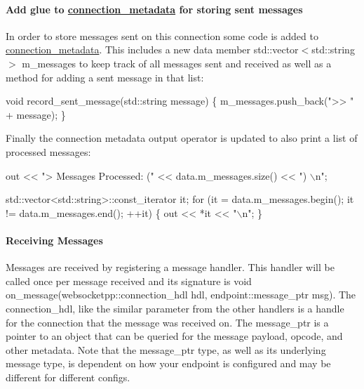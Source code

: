 \paragraph*{Add glue to {\ttfamily \hyperlink{classconnection__metadata}{connection\+\_\+metadata}} for storing sent messages}

In order to store messages sent on this connection some code is added to {\ttfamily \hyperlink{classconnection__metadata}{connection\+\_\+metadata}}. This includes a new data member {\ttfamily std\+::vector$<$std\+::string$>$ m\+\_\+messages} to keep track of all messages sent and received as well as a method for adding a sent message in that list\+:


\begin{DoxyCode}
\textcolor{keywordtype}{void} record\_sent\_message(std::string message) \{
    m\_messages.push\_back(\textcolor{stringliteral}{">> "} + message);
\}
\end{DoxyCode}


Finally the connection metadata output operator is updated to also print a list of processed messages\+:


\begin{DoxyCode}
out << \textcolor{stringliteral}{"> Messages Processed: ("} << data.m\_messages.size() << \textcolor{stringliteral}{") \(\backslash\)n"};

std::vector<std::string>::const\_iterator it;
\textcolor{keywordflow}{for} (it = data.m\_messages.begin(); it != data.m\_messages.end(); ++it) \{
    out << *it << \textcolor{stringliteral}{"\(\backslash\)n"};
\}
\end{DoxyCode}


\paragraph*{Receiving Messages}

Messages are received by registering a message handler. This handler will be called once per message received and its signature is {\ttfamily void on\+\_\+message(websocketpp\+::connection\+\_\+hdl hdl, endpoint\+::message\+\_\+ptr msg)}. The {\ttfamily connection\+\_\+hdl}, like the similar parameter from the other handlers is a handle for the connection that the message was received on. The {\ttfamily message\+\_\+ptr} is a pointer to an object that can be queried for the message payload, opcode, and other metadata. Note that the message\+\_\+ptr type, as well as its underlying message type, is dependent on how your endpoint is configured and may be different for different configs.

